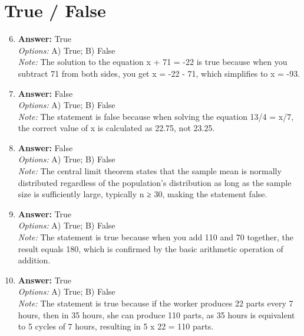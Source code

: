 \documentclass[12pt]{article}
\begin{document}
\section*{True / False}
\begin{enumerate}[label=\arabic*.]
\setcounter{enumi}{5}
\item \textbf{Answer:} True
\\ \textit{Options:} A) True; B) False
\\ \textit{Note:} The solution to the equation x + 71 = -22 is true because when you subtract 71 from both sides, you get x = -22 - 71, which simplifies to x = -93.
\item \textbf{Answer:} False
\\ \textit{Options:} A) True; B) False
\\ \textit{Note:} The statement is false because when solving the equation 13/4 = x/7, the correct value of x is calculated as 22.75, not 23.25.
\item \textbf{Answer:} False
\\ \textit{Options:} A) True; B) False
\\ \textit{Note:} The central limit theorem states that the sample mean is normally distributed regardless of the population's distribution as long as the sample size is sufficiently large, typically n ≥ 30, making the statement false.
\item \textbf{Answer:} True
\\ \textit{Options:} A) True; B) False
\\ \textit{Note:} The statement is true because when you add 110 and 70 together, the result equals 180, which is confirmed by the basic arithmetic operation of addition.
\item \textbf{Answer:} True
\\ \textit{Options:} A) True; B) False
\\ \textit{Note:} The statement is true because if the worker produces 22 parts every 7 hours, then in 35 hours, she can produce 110 parts, as 35 hours is equivalent to 5 cycles of 7 hours, resulting in 5 x 22 = 110 parts.
\end{enumerate}
\end{document}
